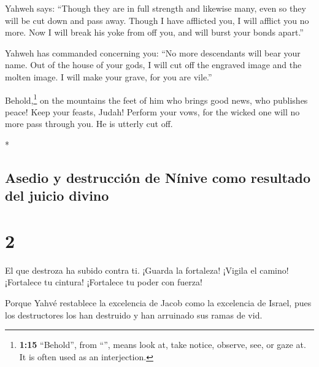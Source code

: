 \begin{paracol}{2}
\begin{otherlanguage}{english}
 Yahweh says: ``Though they are in full strength and
likewise many, even so they will be cut down and pass away. Though I
have afflicted you, I will afflict you no more.  Now I
will break his yoke from off you, and will burst your bonds apart.''

 Yahweh has commanded concerning you: ``No more
descendants will bear your name. Out of the house of your gods, I will
cut off the engraved image and the molten image. I will make your grave,
for you are vile.''

 Behold,\footnote{\textbf{1:15} ``Behold'', from
  ``'', means look at, take notice, observe, see, or gaze
  at. It is often used as an interjection.} on the mountains the feet of
him who brings good news, who publishes peace! Keep your feasts, Judah!
Perform your vows, for the wicked one will no more pass through you. He
is utterly cut off.

\end{otherlanguage}

\switchcolumn[0]*

\hypertarget{asedio-y-destrucciuxf3n-de-nuxednive-como-resultado-del-juicio-divino}{%
\subsection{Asedio y destrucción de Nínive como resultado del juicio
divino}\label{asedio-y-destrucciuxf3n-de-nuxednive-como-resultado-del-juicio-divino}}

\hypertarget{section-2}{%
\section{2}\label{section-2}}

 El que destroza ha subido contra ti. ¡Guarda la
fortaleza! ¡Vigila el camino! ¡Fortalece tu cintura! ¡Fortalece tu poder
con fuerza!

 Porque Yahvé restablece la excelencia de Jacob como la
excelencia de Israel, pues los destructores los han destruido y han
arruinado sus ramas de vid.


\end{paracol}
